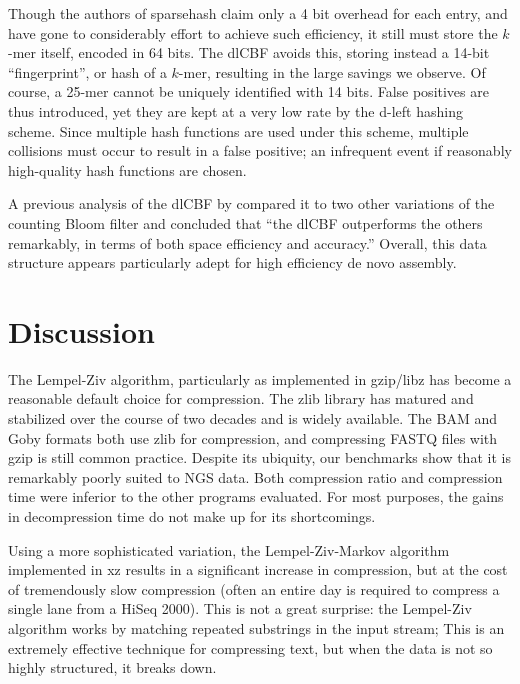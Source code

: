 \documentclass[twocolumn]{article}
\begin{document}
Though the authors of sparsehash claim only a 4 bit overhead for each entry,
and have gone to considerably effort to achieve such efficiency, it still must
store the $k$-mer itself, encoded in 64 bits. The dlCBF avoids this, storing
instead a 14-bit ``fingerprint'', or hash of a $k$-mer, resulting in the large
savings we observe. Of course, a 25-mer cannot be uniquely identified with 14
bits. False positives are thus introduced, yet they are kept at a very low
rate by the d-left hashing scheme. Since multiple hash functions are used
under this scheme, multiple collisions must occur to result in a false
positive; an infrequent event if reasonably high-quality hash functions are
chosen.

A previous analysis of the dlCBF by \citet{Zhang2009} compared it to two other
variations of the counting Bloom filter and concluded that ``the dlCBF
outperforms the others remarkably, in terms of both space efficiency and
accuracy.'' Overall, this data structure appears particularly adept for high
efficiency de novo assembly.

\section{Discussion}



The Lempel-Ziv algorithm, particularly as implemented in gzip/libz has become
a reasonable default choice for compression. The zlib library has matured and stabilized
over the course of two decades and is widely available. The BAM and Goby
formats both use zlib for compression, and compressing FASTQ files with gzip
is still common practice. Despite its ubiquity, our benchmarks show that it is
remarkably poorly suited to NGS data. Both compression ratio and compression
time were inferior to the other programs evaluated. For most purposes, the
gains in decompression time do not make up for its shortcomings.

Using a more sophisticated variation, the Lempel-Ziv-Markov algorithm
implemented in xz results in a significant increase in compression, but at the
cost of tremendously slow compression (often an entire day is required to
compress a single lane from a HiSeq 2000). This is not a great surprise: the
Lempel-Ziv algorithm works by matching repeated substrings in the input
stream; This is an extremely effective technique for compressing text, but
when the data is not so highly structured, it breaks down.
\end{document}
